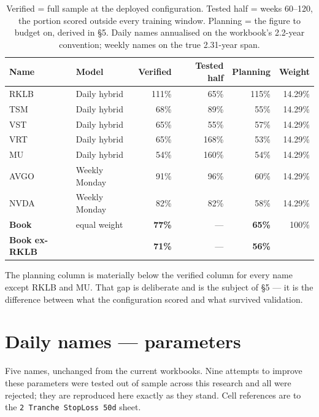 \documentclass[11pt]{article}
\begin{document}
\begin{table}[H]\centering\small
\begin{tabular}{llrrrr}
\toprule
\textbf{Name} & \textbf{Model} & \textbf{Verified} & \textbf{Tested half} & \textbf{Planning} &
\textbf{Weight}\\
\midrule
\rowcolor{bckeep} RKLB & Daily hybrid   & 111\% & 65\%  & 115\% & 14.29\%\\
TSM  & Daily hybrid   & 68\%  & 89\%  & 55\%  & 14.29\%\\
\rowcolor{bckeep} VST  & Daily hybrid   & 65\%  & 55\%  & 57\%  & 14.29\%\\
VRT  & Daily hybrid   & 65\%  & 168\% & 53\%  & 14.29\%\\
\rowcolor{bckeep} MU   & Daily hybrid   & 54\%  & 160\% & 54\%  & 14.29\%\\
AVGO & Weekly Monday  & 91\%  & 96\%  & 60\%  & 14.29\%\\
\rowcolor{bckeep} NVDA & Weekly Monday  & 82\%  & 82\%  & 58\%  & 14.29\%\\
\midrule
\textbf{Book} & equal weight & \textbf{77\%} & --- & \textbf{65\%} & 100\%\\
\textbf{Book ex-RKLB} & & \textbf{71\%} & --- & \textbf{56\%} & \\
\bottomrule
\end{tabular}
\caption{Verified = full sample at the deployed configuration. Tested half = weeks 60--120,
the portion scored outside every training window. Planning = the figure to budget on, derived
in \S5. Daily names annualised on the workbook's 2.2-year convention; weekly names on the true
2.31-year span.}
\end{table}

The planning column is materially below the verified column for every name except RKLB and MU.
That gap is deliberate and is the subject of \S5 --- it is the difference between what the
configuration scored and what survived validation.

\section{Daily names --- parameters}

Five names, unchanged from the current workbooks. Nine attempts to improve these parameters were
tested out of sample across this research and all were rejected; they are reproduced here exactly
as they stand. Cell references are to the \texttt{2 Tranche StopLoss 50d} sheet.
\end{document}
